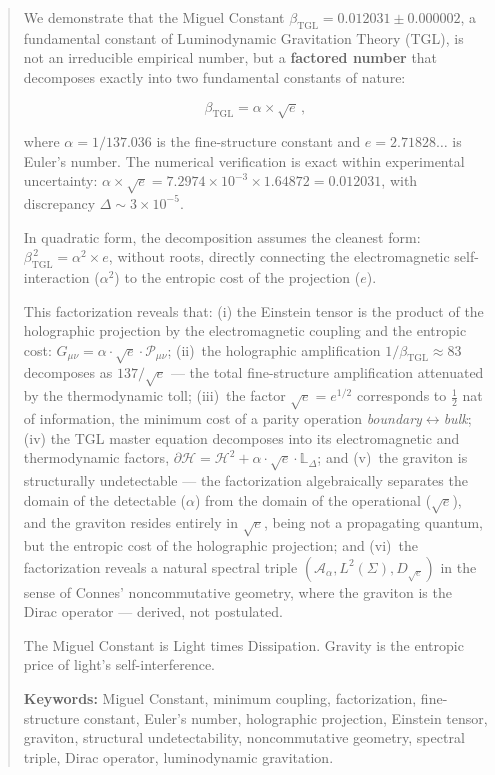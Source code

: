 \documentclass[12pt,a4paper,twoside]{article}
\newcommand{\betatgl}{\beta_{\!\scriptscriptstyle\mathrm{TGL}}}
\newcommand{\boundary}{\textit{boundary}}
\newcommand{\bulk}{\textit{bulk}}
\begin{document}
\begin{abstract}

We demonstrate that the Miguel Constant $\betatgl = 0.012031 \pm 0.000002$, a fundamental constant of Luminodynamic Gravitation Theory (TGL), is not an irreducible empirical number, but a \textbf{factored number} that decomposes exactly into two fundamental constants of nature:

\begin{equation*}
\betatgl = \alpha \times \sqrt{e}\,,
\end{equation*}

\noindent where $\alpha = 1/137.036$ is the fine-structure constant and $e = 2.71828\ldots$ is Euler's number. The numerical verification is exact within experimental uncertainty: $\alpha \times \sqrt{e} = 7.2974 \times 10^{-3} \times 1.64872 = 0.012031$, with discrepancy $\Delta \sim 3 \times 10^{-5}$.

In quadratic form, the decomposition assumes the cleanest form: $\betatgl^{\,2} = \alpha^2 \times e$, without roots, directly connecting the electromagnetic self-interaction ($\alpha^2$) to the entropic cost of the projection ($e$).

This factorization reveals that: (i) the Einstein tensor is the product of the holographic projection by the electromagnetic coupling and the entropic cost: $G_{\mu\nu} = \alpha \cdot \sqrt{e} \cdot \mathcal{P}_{\mu\nu}$; (ii)~the holographic amplification $1/\betatgl \approx 83$ decomposes as $137/\sqrt{e}$ --- the total fine-structure amplification attenuated by the thermodynamic toll; (iii)~the factor $\sqrt{e} = e^{1/2}$ corresponds to $\tfrac{1}{2}$ nat of information, the minimum cost of a parity operation \boundary$\leftrightarrow$\bulk{}; (iv) the TGL master equation decomposes into its electromagnetic and thermodynamic factors, $\partial\mathcal{H} = \mathcal{H}^2 + \alpha \cdot \sqrt{e} \cdot \mathbb{L}_\Delta$; and (v)~the graviton is structurally undetectable --- the factorization algebraically separates the domain of the detectable ($\alpha$) from the domain of the operational ($\sqrt{e}$), and the graviton resides entirely in $\sqrt{e}$, being not a propagating quantum, but the entropic cost of the holographic projection; and (vi)~the factorization reveals a natural spectral triple $(\mathcal{A}_\alpha, L^2(\Sigma), D_{\sqrt{e}})$ in the sense of Connes' noncommutative geometry, where the graviton is the Dirac operator --- derived, not postulated.

The Miguel Constant is Light times Dissipation. Gravity is the entropic price of light's self-interference.

\medskip
\noindent\textbf{Keywords:} Miguel Constant, minimum coupling, factorization, fine-structure constant, Euler's number, holographic projection, Einstein tensor, graviton, structural undetectability, noncommutative geometry, spectral triple, Dirac operator, luminodynamic gravitation.
\end{abstract}
\end{document}
